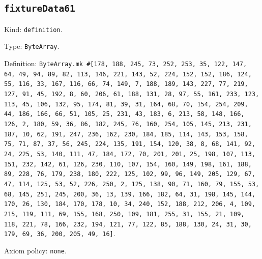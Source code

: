 \documentclass[11pt]{article}
\begin{document}
\subsection*{\texttt{fixtureData61}}
\noindent Kind: \texttt{definition}.\par
\noindent Type: \texttt{ByteArray}.\par
\noindent Definition: \texttt{ByteArray.mk \#[178, 188, 245, 73, 252, 253, 35, 122, 147, 64, 49, 94, 89, 82, 113, 146, 221, 143, 52, 224, 152, 152, 186, 124, 55, 116, 33, 167, 116, 66, 74, 149, 7, 188, 189, 143, 227, 77, 219, 127, 91, 45, 192, 8, 60, 206, 61, 188, 131, 28, 97, 55, 161, 233, 123, 113, 45, 106, 132, 95, 174, 81, 39, 31, 164, 68, 70, 154, 254, 209, 44, 186, 166, 66, 51, 105, 25, 231, 43, 183, 6, 213, 58, 148, 166, 126, 2, 180, 59, 36, 86, 182, 245, 76, 160, 254, 105, 145, 213, 231, 187, 10, 62, 191, 247, 236, 162, 230, 184, 185, 114, 143, 153, 158, 75, 71, 87, 37, 56, 245, 224, 135, 191, 154, 120, 38, 8, 68, 141, 92, 24, 225, 53, 140, 111, 47, 184, 172, 70, 201, 201, 25, 198, 107, 113, 151, 232, 142, 61, 126, 230, 110, 107, 154, 160, 149, 198, 161, 188, 89, 228, 76, 179, 238, 180, 222, 125, 102, 99, 96, 149, 205, 129, 67, 47, 114, 125, 53, 52, 226, 250, 2, 125, 138, 90, 71, 160, 79, 155, 53, 68, 145, 251, 245, 200, 36, 13, 139, 166, 182, 64, 31, 198, 145, 144, 170, 26, 130, 184, 170, 178, 10, 34, 240, 152, 188, 212, 206, 4, 109, 215, 119, 111, 69, 155, 168, 250, 109, 181, 255, 31, 155, 21, 109, 118, 221, 78, 166, 232, 194, 121, 77, 122, 85, 188, 130, 24, 31, 30, 179, 69, 36, 200, 205, 49, 16]}.\par
\noindent Axiom policy: \texttt{none}.\par
\end{document}
